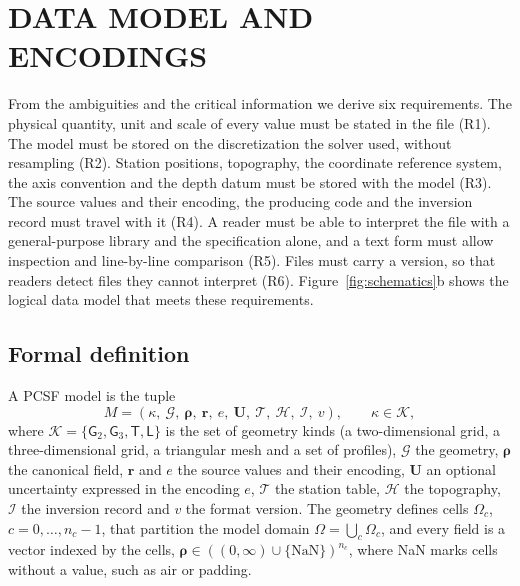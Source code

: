 \documentclass[manuscript]{geophysics}
\newcommand{\Gtwo}{\mathsf{G}_{2}}
\newcommand{\Gthree}{\mathsf{G}_{3}}
\newcommand{\Mtri}{\mathsf{T}}
\newcommand{\Lset}{\mathsf{L}}
\begin{document}
\section{DATA MODEL AND ENCODINGS}

From the ambiguities and the critical information we derive six
requirements. The physical quantity, unit and scale of every value
must be stated in the file (R1). The model must be stored on the
discretization the solver used, without resampling (R2). Station
positions, topography, the coordinate reference system, the axis
convention and the depth datum must be stored with the model (R3). The
source values and their encoding, the producing code and the inversion
record must travel with it (R4). A reader must be able to interpret the
file with a general-purpose library and the specification alone, and a
text form must allow inspection and line-by-line comparison (R5).
Files must carry a version, so that readers detect files they cannot
interpret (R6). Figure~\ref{fig:schematics}b shows the logical data
model that meets these requirements.

\subsection{Formal definition}

A PCSF model is the tuple
\begin{equation}
M = \left(\kappa,\ \mathcal{G},\ \boldsymbol{\rho},\ \mathbf{r},\ e,\
\mathbf{U},\ \mathcal{T},\ \mathcal{H},\ \mathcal{I},\ v\right),
\qquad \kappa \in \mathcal{K},
\label{eq:model}
\end{equation}
where $\mathcal{K} = \{\Gtwo, \Gthree, \Mtri, \Lset\}$ is the set of
geometry kinds (a two-dimensional grid, a three-dimensional grid, a
triangular mesh and a set of profiles), $\mathcal{G}$ the geometry, $\boldsymbol{\rho}$ the canonical
field, $\mathbf{r}$ and $e$ the source values and their encoding,
$\mathbf{U}$ an optional uncertainty expressed in the encoding $e$,
$\mathcal{T}$ the station table, $\mathcal{H}$ the topography,
$\mathcal{I}$ the inversion record and $v$ the format version. The
geometry defines cells $\Omega_c$, $c = 0, \ldots, n_c - 1$, that
partition the model domain $\Omega = \bigcup_c \Omega_c$, and every
field is a vector indexed by the cells,
$\boldsymbol{\rho} \in \left((0, \infty) \cup
\{\mathrm{NaN}\}\right)^{n_c}$, where NaN marks cells without a value,
such as air or padding.
\end{document}
